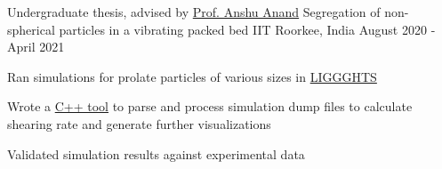 \begin{cventries}
\cventrylast
    {Undergraduate thesis, advised by \href{https://ch.iitr.ac.in/~CH/Anshu_Anand}{Prof. Anshu Anand}}
    {Segregation of  non-spherical particles in a vibrating packed bed}
    {IIT Roorkee, India}
    {August 2020 - April 2021}
    {
      \begin{cvitems}
      \item {Ran simulations for prolate particles of various sizes in \href{https://www.cfdem.com/liggghts-open-source-discrete-element-method-particle-simulation-code}{LIGGGHTS}}
      \item {Wrote a \href{https://github.com/KarthikRIyer/Liggghts_VBP_VTKReader}{C++ tool} to parse and process simulation dump files to calculate shearing rate and generate further visualizations}
      \item {Validated simulation results against experimental data}
      \end{cvitems} 
    }
\end{cventries}
